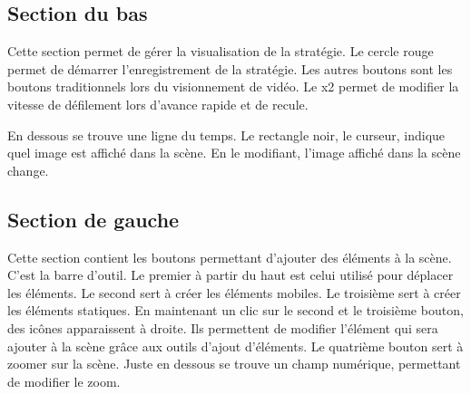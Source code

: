 \subsection{Section du bas}

Cette section permet de gérer la visualisation de la stratégie. Le cercle rouge permet de démarrer l'enregistrement de la stratégie. Les autres boutons sont les boutons traditionnels lors du visionnement de vidéo. Le x2 permet de modifier la vitesse de défilement lors d'avance rapide et de recule. 

En dessous se trouve une ligne du temps. Le rectangle noir, le curseur, indique quel image est affiché dans la scène. En le modifiant, l'image affiché dans la scène change. 

\subsection{Section de gauche}

Cette section contient les boutons permettant d'ajouter des éléments à la scène. C'est la barre d'outil. Le premier à partir du haut est celui utilisé pour déplacer les éléments. Le second sert à créer les éléments mobiles. Le troisième sert à créer les éléments statiques. En maintenant un clic sur le second et le troisième bouton, des icônes apparaissent à droite. Ils permettent de modifier l'élément qui sera ajouter à la scène grâce aux outils d'ajout d'éléments. Le quatrième bouton sert à zoomer sur la scène. Juste en dessous se trouve un champ numérique, permettant de modifier le zoom. 